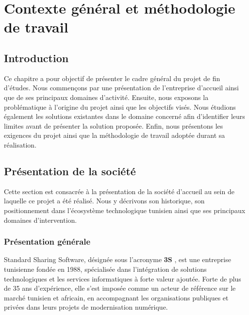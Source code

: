 \chapter{Contexte général et méthodologie de travail}

\minitoc

\newpage

\section{Introduction}

Ce chapitre a pour objectif de présenter le cadre général du projet de fin d’études. 
Nous commençons par une présentation de l’entreprise d’accueil ainsi que de ses principaux domaines d’activité. 
Ensuite, nous exposons la problématique à l’origine du projet ainsi que les objectifs visés. 
Nous étudions également les solutions existantes dans le domaine concerné afin d’identifier leurs limites avant de présenter la solution proposée. 
Enfin, nous présentons les exigences du projet ainsi que la méthodologie de travail adoptée durant sa réalisation.





\section{Présentation de la société}

Cette section est consacrée à la présentation de la société d'accueil au sein de laquelle ce projet a été réalisé. Nous y décrivons son historique, son positionnement dans l'écosystème technologique tunisien ainsi que ses principaux domaines d'intervention.


\subsection{Présentation générale}

Standard Sharing Software, désignée sous l'acronyme \textbf{3S} \cite{site3s}, est une entreprise tunisienne fondée en 1988, spécialisée dans l'intégration de solutions technologiques et les services informatiques à forte valeur ajoutée. Forte de plus de 35 ans d'expérience, elle s'est imposée comme un acteur de référence sur le marché tunisien et africain, en accompagnant les organisations publiques et privées dans leurs projets de modernisation numérique.

